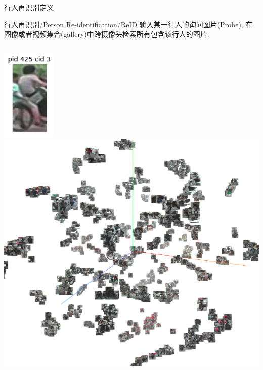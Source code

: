 \documentclass[notes]{beamer}
\begin{document}
\begin{frame}
	{行人再识别定义}
	\begin{block}{行人再识别/Person Re-identification/ReID}
		输入某一行人的询问图片(Probe), 在图像或者视频集合(gallery)中跨摄像头检索所有包含该行人的图片. 
	\end{block}
	\begin{columns}
		\centering 
		\includegraphics[width=0.5\linewidth]{2018-03-12-10-05-13.png}
		\centering
		\includegraphics[width=0.72\linewidth]{2018-03-12-09-57-11.png}
	\end{columns}
\end{frame}
\end{document}
